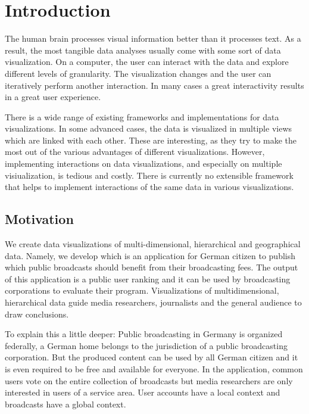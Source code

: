 \chapter{Introduction}
The human brain processes visual information better than it processes text.
As a result, the most tangible data analyses usually come with some sort of data visualization.
On a computer, the user can interact with the data and explore different levels of granularity.
The visualization changes and the user can iteratively perform another interaction.
In many cases a great interactivity results in a great user experience.

There is a wide range of existing frameworks and implementations for data visualizations.
In some advanced cases, the data is visualized in multiple views which are linked with each other.
These \cmvs{} are interesting, as they try to make the most out of the various advantages of different visualizations.
However, implementing interactions on data visualizations, and especially on multiple visiualization, is tedious and costly.
There is currently no extensible framework that helps to implement interactions of the same data in various visualizations.


\section{Motivation}\label{sec:outline}

We create data visualizations of multi-dimensional, hierarchical and geographical data.
Namely, we develop \rufu{} which is an application for German citizen to publish which public broadcasts should benefit from their broadcasting fees.
The output of this application is a public user ranking and it can be used by broadcasting corporations to evaluate their program.
Visualizations of multidimensional, hierarchical data guide media researchers, journalists and the general audience to draw conclusions.

To explain this a little deeper:
Public broadcasting in Germany is organized federally, a German home belongs to the jurisdiction of a public broadcasting corporation.
But the produced content can be used by all German citizen and it is even required to be free and available for everyone.
In the application, common users vote on the entire collection of broadcasts but media researchers are only interested in users of a service area.
User accounts have a local context and broadcasts have a global context.

